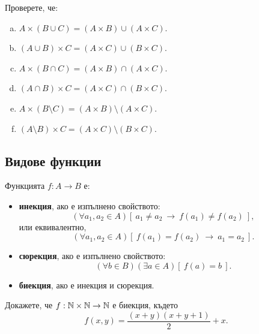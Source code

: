 \begin{problem}
  Проверете, че:
  \begin{enumerate}[a)]
  \item
    $A\times(B\cup C) = (A\times B) \cup (A\times C)$.
  \item
    $(A\cup B)\times C = (A\times C)\cup (B\times C)$.
  \item 
    $A\times(B\cap C) = (A\times B) \cap (A\times C)$.
  \item
    $(A \cap B)\times C = (A \times C)\cap(B\times C)$.
  \item 
    $A\times(B\setminus C) = (A\times B) \setminus (A\times C)$.
  \item
    $(A\setminus B)\times C = (A\times C)\setminus (B\times C)$.
  \end{enumerate}
\end{problem}


\subsection*{Видове функции}

Функцията $f:A \to B$ е:
\begin{itemize}
\item
  {\bf инекция}, ако е изпълнено свойството:
  \[(\forall a_1,a_2\in A)[\ a_1\neq a_2\ \to\ f(a_1)\neq f(a_2)\ ],\]
  или еквивалентно,
  \[(\forall a_1,a_2\in A)[\ f(a_1) = f(a_2)\ \to\ a_1 = a_2\ ].\]
\item
  {\bf сюрекция}, ако е изпълнено свойството:
  \[(\forall b\in B)(\exists a\in A)[\ f(a) = b\ ].\]
\item
  {\bf биекция}, ако е инекция и сюрекция.
\end{itemize}

\begin{problem}
  Докажете, че $f: \mathbb{N} \times \mathbb{N}\rightarrow \mathbb{N}$ е биекция, където
  \[f(x, y) = \frac{(x+y)(x+y+1)}{2} + x.\]
\end{problem}


